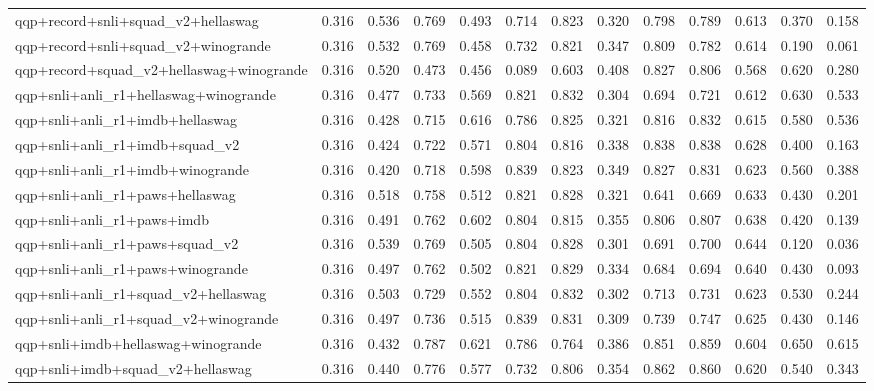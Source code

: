 \begin{table}[t]
\begin{tabular}{lrrrrrrrrrrrr}
    qqp+record+snli+squad\_v2+hellaswag & 0.316 & 0.536 & 0.769 & 0.493 & 0.714 & 0.823 & 0.320 & 0.798 & 0.789 & 0.613 & 0.370 & 0.158 \\
    qqp+record+snli+squad\_v2+winogrande & 0.316 & 0.532 & 0.769 & 0.458 & 0.732 & 0.821 & 0.347 & 0.809 & 0.782 & 0.614 & 0.190 & 0.061 \\
    qqp+record+squad\_v2+hellaswag+winogrande & 0.316 & 0.520 & 0.473 & 0.456 & 0.089 & 0.603 & 0.408 & 0.827 & 0.806 & 0.568 & 0.620 & 0.280 \\
    qqp+snli+anli\_r1+hellaswag+winogrande & 0.316 & 0.477 & 0.733 & 0.569 & 0.821 & 0.832 & 0.304 & 0.694 & 0.721 & 0.612 & 0.630 & 0.533 \\
    qqp+snli+anli\_r1+imdb+hellaswag & 0.316 & 0.428 & 0.715 & 0.616 & 0.786 & 0.825 & 0.321 & 0.816 & 0.832 & 0.615 & 0.580 & 0.536 \\
    qqp+snli+anli\_r1+imdb+squad\_v2 & 0.316 & 0.424 & 0.722 & 0.571 & 0.804 & 0.816 & 0.338 & 0.838 & 0.838 & 0.628 & 0.400 & 0.163 \\
    qqp+snli+anli\_r1+imdb+winogrande & 0.316 & 0.420 & 0.718 & 0.598 & 0.839 & 0.823 & 0.349 & 0.827 & 0.831 & 0.623 & 0.560 & 0.388 \\
    qqp+snli+anli\_r1+paws+hellaswag & 0.316 & 0.518 & 0.758 & 0.512 & 0.821 & 0.828 & 0.321 & 0.641 & 0.669 & 0.633 & 0.430 & 0.201 \\
    qqp+snli+anli\_r1+paws+imdb & 0.316 & 0.491 & 0.762 & 0.602 & 0.804 & 0.815 & 0.355 & 0.806 & 0.807 & 0.638 & 0.420 & 0.139 \\
    qqp+snli+anli\_r1+paws+squad\_v2 & 0.316 & 0.539 & 0.769 & 0.505 & 0.804 & 0.828 & 0.301 & 0.691 & 0.700 & 0.644 & 0.120 & 0.036 \\
    qqp+snli+anli\_r1+paws+winogrande & 0.316 & 0.497 & 0.762 & 0.502 & 0.821 & 0.829 & 0.334 & 0.684 & 0.694 & 0.640 & 0.430 & 0.093 \\
    qqp+snli+anli\_r1+squad\_v2+hellaswag & 0.316 & 0.503 & 0.729 & 0.552 & 0.804 & 0.832 & 0.302 & 0.713 & 0.731 & 0.623 & 0.530 & 0.244 \\
    qqp+snli+anli\_r1+squad\_v2+winogrande & 0.316 & 0.497 & 0.736 & 0.515 & 0.839 & 0.831 & 0.309 & 0.739 & 0.747 & 0.625 & 0.430 & 0.146 \\
    qqp+snli+imdb+hellaswag+winogrande & 0.316 & 0.432 & 0.787 & 0.621 & 0.786 & 0.764 & 0.386 & 0.851 & 0.859 & 0.604 & 0.650 & 0.615 \\
    qqp+snli+imdb+squad\_v2+hellaswag & 0.316 & 0.440 & 0.776 & 0.577 & 0.732 & 0.806 & 0.354 & 0.862 & 0.860 & 0.620 & 0.540 & 0.343 \\

\end{tabular}
\end{table}
